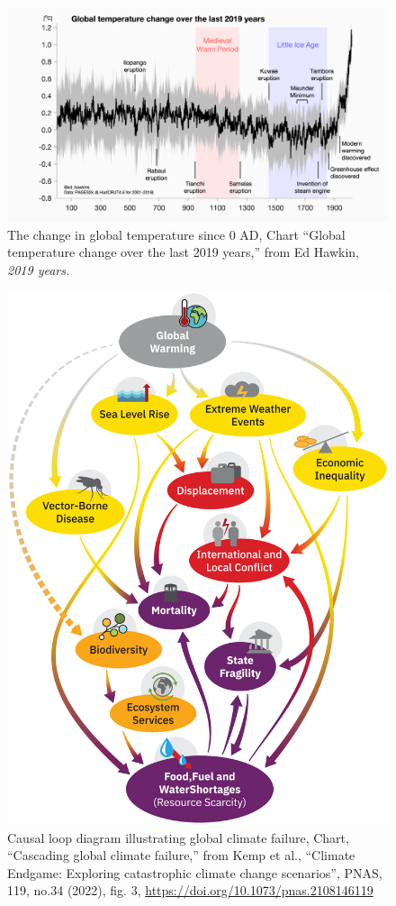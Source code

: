 \begin{figure}[h]
\centering
\includegraphics[width=0.9\linewidth]{lia_mwp-1.png}
\caption{The change in global temperature since 0 AD, Chart ``Global temperature change over the last 2019 years,'' from Ed Hawkin, \emph{2019 years.}}
\end{figure}

\newpage

\begin{figure}[h!]
\centering
\includegraphics[width=0.9\linewidth]{pnas.2108146119fig03.jpg}
\caption{Causal loop diagram illustrating global climate failure, Chart, “Cascading global climate failure,” from Kemp et al., “Climate Endgame: Exploring catastrophic climate change scenarios”, PNAS, 119, no.34 (2022), fig. 3, \url{https://doi.org/10.1073/pnas.2108146119}}
\end{figure}

\newpage